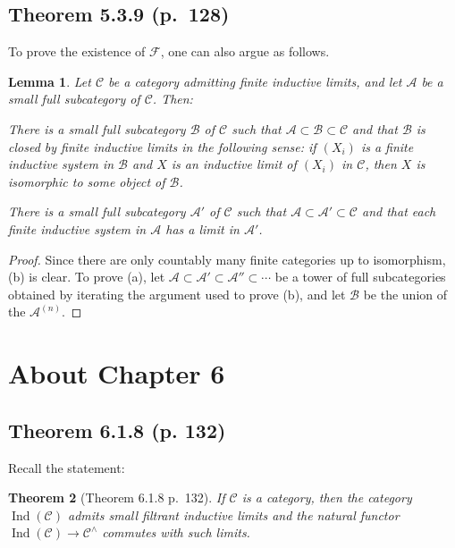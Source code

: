 \documentclass[12pt]{article}
\newtheorem{thm}{Theorem}
\newtheorem{lem}[thm]{Lemma}
\theoremstyle{remark}
\theoremstyle{definition}
\newcommand{\nn}{\noindent}
\newcommand{\A}{\mathcal A}
\newcommand{\B}{\mathcal B}
\newcommand{\C}{\mathcal C}
\newcommand{\F}{\mathcal F}
\DeclareMathOperator{\Ind}{Ind}
\begin{document}

\subsection{Theorem 5.3.9 (p.~128)}

To prove the existence of $\F$, one can also argue as follows. 

\begin{lem} 
Let $\C$ be a category admitting finite inductive limits, and let $\A$ be a small full subcategory of $\C$. Then:

\nn{\em(a)} There is a small full subcategory $\B$ of $\C$ such that $\A\subset\B\subset \C$ and that $\B$ is closed by finite inductive limits in the following sense: if $(X_i)$ is a finite inductive system in $\B$ and $X$ is an inductive limit of $(X_i)$ in $\C$, then $X$ is isomorphic to some object of $\B$.

\nn{\em(b)} There is a small full subcategory $\A'$ of $\C$ such that $\A\subset\A'\subset \C$ and that each finite inductive system in $\A$ has a limit in $\A'$. 
\end{lem} 

\begin{proof}
Since there are only countably many finite categories up to isomorphism, (b) is clear. To prove (a), let $\A\subset\A'\subset\A''\subset\cdots$ be a tower of full subcategories obtained by iterating the argument used to prove (b), and let $\B$ be the union of the $\A^{(n)}$.
\end{proof}


\section{About Chapter 6}

\subsection{Theorem 6.1.8 (p. 132)} 

Recall the statement:

\begin{thm}[Theorem 6.1.8 p.~132]\label{618}
If $\C$ is a category, then the category $\Ind(\C)$ admits small filtrant inductive limits and the natural functor $\Ind(\C)\to\C^\wedge$ commutes with such limits.
\end{thm} 

\end{document}
